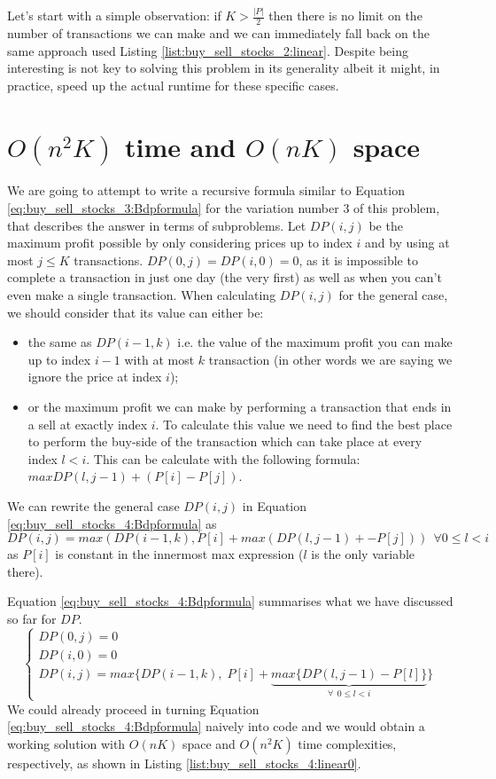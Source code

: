 Let's start with a simple observation: if $K > \frac{|P|}{2}$ then there is no limit on the number of transactions we can make
and we can immediately fall back on the same approach used Listing \ref{list:buy_sell_stocks_2:linear}.
Despite being interesting is not key to solving this problem in its generality albeit it might, in practice, speed up the actual runtime for these specific cases.


\section{$O(n^2K)$ time and $O(nK)$ space}
\label{buy_sell_stocks4:sec:linerartime1}
We are going to attempt to write a recursive formula similar to Equation \ref{eq:buy_sell_stocks_3:Bdpformula} for the variation number $3$ of this problem, that describes the answer in terms of subproblems.
Let $DP(i,j)$ be the maximum profit possible by only considering prices up to index $i$ and by using at most $j \leq K$ transactions.
$DP(0,j)=DP(i,0)=0$, as it is impossible to complete a transaction in just one day (the very first) as well as when you can't even make a single transaction.
When calculating $DP(i,j)$ for the general case, we should consider that its value can either be:
\begin{itemize}
    \item the same as $DP(i-1,k)$ i.e. the value of the maximum profit you can make up to index $i-1$ with at most $k$ transaction (in other words we are saying we ignore the price at index $i$);
    \item or the maximum profit we can make by performing a transaction that ends in a sell at exactly index $i$. To calculate this value we need to find the best place to perform the buy-side of the transaction which can take place at every index $l < i$. This can be calculate with the following formula: $max DP(l,j-1) + (P[i]-P[j])$.
\end{itemize}
We can rewrite the general case $DP(i,j)$ in Equation \ref{eq:buy_sell_stocks_4:Bdpformula} as 
$$DP(i,j) = max(DP(i-1,k), P[i] + max(DP(l,j-1)+-P[j])) \: \: \forall 0 \leq l < i$$ as $P[i]$ is constant in the innermost max expression ($l$ is the only variable there).

Equation \ref{eq:buy_sell_stocks_4:Bdpformula} summarises what we have discussed so far for $DP$.
\begin{equation}
    \begin{cases}
        DP(0,j) = 0 \\
        DP(i,0) = 0 \\
        DP(i,j) = max\Big\{DP(i-1,k), \; P[i] + \underbrace{max\big\{DP(l,j-1)-P[l]\big\}}_{\forall \: \: 0 \leq l < i}\Big\}
     \end{cases}
    \label{eq:buy_sell_stocks_4:Bdpformula}
\end{equation}
We could already proceed in turning Equation \ref{eq:buy_sell_stocks_4:Bdpformula} naively into code and we would obtain a working solution with $O(nK)$ space and $O(n^2K)$ time complexities, 
respectively, as shown in Listing \ref{list:buy_sell_stocks_4:linear0}.

